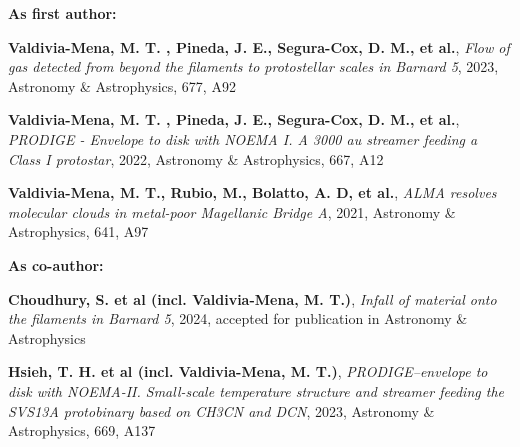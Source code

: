 \vspace{8pt}

\begin{cvparagraph}
\textbf{As first author:}
\vspace{4pt}
\begin{cvitems} %
	\item{\textbf{Valdivia-Mena, M. T. , Pineda, J. E., Segura-Cox, D. M., et al.}, \textit{Flow of gas detected from beyond the filaments to protostellar scales in Barnard 5}, 2023, Astronomy \& Astrophysics, 677, A92}
	\item{\textbf{Valdivia-Mena, M. T. , Pineda, J. E., Segura-Cox, D. M., et al.}, \textit{PRODIGE - Envelope to disk with NOEMA I. A 3000 au streamer feeding a Class I protostar}, 2022, Astronomy \& Astrophysics, 667, A12}
	\item{\textbf{Valdivia-Mena, M. T., Rubio, M., Bolatto, A. D, et al.}, \textit{ALMA resolves molecular clouds in metal-poor Magellanic Bridge A}, 2021, Astronomy \& Astrophysics, 641, A97}
\end{cvitems}
\vspace{8pt}
\textbf{As co-author:}
\vspace{4pt}
\begin{cvitems} %
	\item{{\textbf{Choudhury, S. et al (incl. Valdivia-Mena, M. T.)}, \textit{Infall of material onto the filaments in Barnard 5}, 2024, accepted for publication in Astronomy \& Astrophysics}}
	\item{{\textbf{Hsieh, T. H. et al (incl. Valdivia-Mena, M. T.)}, \textit{PRODIGE–envelope to disk with NOEMA-II. Small-scale temperature structure and streamer feeding the SVS13A protobinary based on CH3CN and DCN}, 2023, Astronomy \& Astrophysics, 669, A137}}
	
\end{cvitems}
\vspace{4pt}
\end{cvparagraph}


